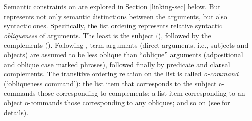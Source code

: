 \documentclass[output=paper
	        ,collection
	        ,collectionchapter
 	        ,biblatex
                ,babelshorthands
                ,newtxmath
                ,draftmode
                ,colorlinks, citecolor=brown
]{langscibook}
\begin{document}
Semantic constraints on \argst are explored in Section \ref{linking-sec} below.  But \argst represents not only
semantic distinctions between the arguments, but also  %
syntactic  ones.  Specifically, the list ordering represents relative syntactic \textit{obliqueness} of arguments.   The least  is the subject (\subj), followed by the complements (\comps).  Following \citet{Manning1996}, term arguments (direct arguments, i.e., subjects and objects) are  assumed to be less oblique than ``oblique'' arguments (adpositional and oblique case marked phrases), followed finally by predicate and clausal complements.  The transitive ordering relation on the \argst list is called \textit{o-command} (`obliqueness command'):  the list item that corresponds to the subject o-commands those corresponding to complements; a list item corresponding to an object o-commands  those corresponding to any obliques; and so on (see  for details).
 


\end{document}
